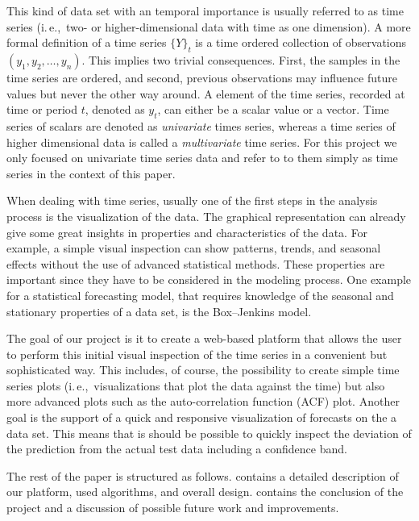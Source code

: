 \documentclass[runningheads,a4paper,11pt]{llncs}
\newcommand{\ie}{i.\,e.,\ }
\begin{document}
This kind of data set with an temporal importance is usually referred to as time series (\ie two- or higher-dimensional data with time as one dimension). 
A more formal definition \cite{Cortez2012} of a time series \(\{Y\}_t\) is a time ordered collection of observations \((y_1, y_2, \ldots, y_n)\).
This implies two trivial consequences. 
First, the samples in the time series are ordered, and second, previous observations may influence future values but never the other way around.
A element of the time series, recorded at time or period \(t\), denoted as \(y_t\), can either be a scalar value or a vector.
Time series of scalars are denoted as \emph{univariate} times series, whereas a time series of higher dimensional data is called a \emph{multivariate} time series.
For this project we only focused on univariate time series data and refer to to them simply as time series in the context of this paper.

When dealing with time series, usually one of the first steps in the analysis process is the visualization of the data.
The graphical representation can already give some great insights in properties and characteristics of the data.
For example, a simple visual inspection can show patterns, trends, and seasonal effects without the use of advanced statistical methods. 
These properties are important since they have to be considered in the modeling process.
One example for a statistical forecasting model, that requires knowledge of the seasonal and stationary properties of a data set, is the Box--Jenkins \cite{Box1976} model.

The goal of our project is it to create a web-based platform that allows the user to perform this initial visual inspection of the time series in a convenient but sophisticated way.
This includes, of course, the possibility to create simple time series plots (\ie visualizations that plot the data against the time) but also more advanced plots such as the auto-correlation function (ACF) plot.
Another goal is the support of a quick and responsive visualization of forecasts on the a data set. 
This means that is should be possible to quickly inspect the deviation of the prediction from the actual test data including a confidence band.

The rest of the paper is structured as follows. 
 contains a detailed description of our platform, used algorithms, and overall design.
 contains the conclusion of the project and a discussion of possible future work and improvements.
\end{document}
